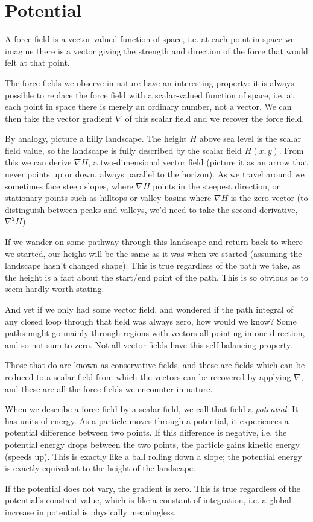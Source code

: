 \chapter{Potential}

A force field is a vector-valued function of space, i.e. at each point in space we imagine there is a vector giving the strength and direction of the force that would felt at that point.

The force fields we observe in nature have an interesting property: it is always possible to replace the force field with a scalar-valued function of space, i.e. at each point in space there is merely an ordinary number, not a vector. We can then take the vector gradient $\nabla$ of this scalar field and we recover the force field.

By analogy, picture a hilly landscape. The height $H$ above sea level is the scalar field value, so the landscape is fully described by the scalar field $H(x, y)$. From this we can derive $\nabla H$, a two-dimensional vector field (picture it as an arrow that never points up or down, always parallel to the horizon). As we travel around we sometimes face steep slopes, where $\nabla H$ points in the steepest direction, or stationary points such as hilltops or valley basins where $\nabla H$ is the zero vector (to distinguish between peaks and valleys, we'd need to take the second derivative, $\nabla^2H$).

If we wander on some pathway through this landscape and return back to where we started, our height will be the same as it was when we started (assuming the landscape hasn't changed shape). This is true regardless of the path we take, as the height is a fact about the start/end point of the path. This is so obvious as to seem hardly worth stating.

And yet if we only had some vector field, and wondered if the path integral of any closed loop through that field was always zero, how would we know? Some paths might go mainly through regions with vectors all pointing in one direction, and so not sum to zero. Not all vector fields have this self-balancing property.

Those that do are known as conservative fields, and these are fields which can be reduced to a scalar field from which the vectors can be recovered by applying $\nabla$, and these are all the force fields we encounter in nature.

When we describe a force field by a scalar field, we call that field a \textit{potential}. It has units of energy. As a particle moves through a potential, it experiences a potential difference between two points. If this difference is negative, i.e. the potential energy drops between the two points, the particle gains kinetic energy (speeds up). This is exactly like a ball rolling down a slope; the potential energy is exactly equivalent to the height of the landscape.

If the potential does not vary, the gradient is zero. This is true regardless of the potential's constant value, which is like a constant of integration, i.e. a global increase in potential is physically meaningless.
